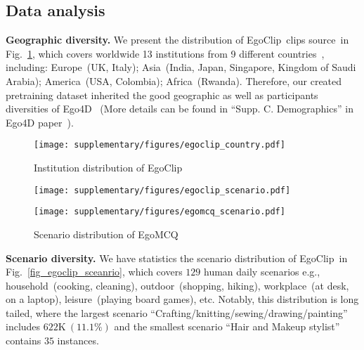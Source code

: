 \documentclass{article}
\newcommand{\dataset}{EgoClip}
\newcommand{\eval}{EgoMCQ}
\begin{document}
\subsection{Data analysis}\label{a3}
\noindent\textbf{Geographic diversity.}
We present the distribution of \dataset~clips source~in Fig.~\ref{fig_egoclip_country}, which covers worldwide 13 institutions from 9 different countries~\cite{grauman2021ego4d}, including:
Europe~(UK, Italy);
Asia~(India, Japan, Singapore, Kingdom of Saudi Arabia);
America~(USA, Colombia);
Africa~(Rwanda).
Therefore, our created pretraining dataset inherited the good geographic as well as participants diversities of Ego4D~
(More details can be found in ``Supp. C. Demographics'' in Ego4D paper~\cite{grauman2021ego4d}).
\begin{figure}[htb]
\vspace{-0.25cm}
    \centering
    \texttt{[image: supplementary/figures/egoclip\_country.pdf]}
    \caption{Institution distribution of \dataset}
    \label{fig_egoclip_country}
\vspace{-0.5cm}
\end{figure} \newpage

\begin{figure}[H]
\centering
\begin{minipage}[t]{0.45\textwidth}
\centering
\texttt{[image: supplementary/figures/egoclip\_scenario.pdf]}
\caption{Scenario distribution of \dataset}
\label{fig_egoclip_sceanrio}
\end{minipage}
\quad
\begin{minipage}[t]{0.45\textwidth}
\centering
\texttt{[image: supplementary/figures/egomcq\_scenario.pdf]}
\caption{Scenario distribution of \eval}
\label{case_1}
\end{minipage}
\centering
\label{fig_egomcq_sceanrio}
\end{figure} 
\noindent\textbf{Scenario diversity.}
We have statistics the scenario distribution of \dataset~in Fig.~\ref{fig_egoclip_sceanrio}, which covers $129$ human daily scenarios e.g., household~(cooking, cleaning), outdoor~(shopping, hiking), workplace~(at desk, on a laptop), leisure~(playing board games), etc.
Notably, this distribution is long tailed, where the largest scenario ``Crafting/knitting/sewing/drawing/painting'' includes $622\text{K}~(11.1\%)$ and the smallest scenario ``Hair and Makeup stylist'' contains $35$ instances.
\end{document}
